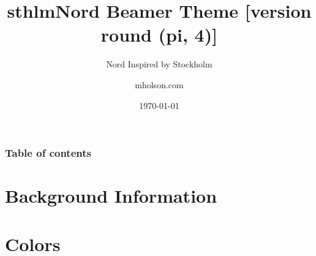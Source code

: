 \documentclass[aspectratio=169,sectionpages,bibref]{beamer}
\title{sthlmNord Beamer Theme [version round (pi, 4)]}
\subtitle{Nord Inspired by Stockholm}
\author{mholson.com}
\institute{School in Stockholm}
\date{\today}
\begin{document}
\titlepage%


\begin{frame}
	\frametitle{Table of contents}
	\tableofcontents
\end{frame}

\section{Background Information}










\section{Colors}





\end{document}
